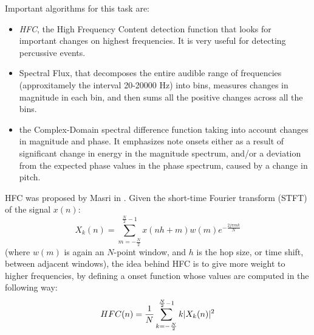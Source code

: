 Important algorithms for this task are:
\begin{itemize}
\item \textit{HFC}, the High Frequency Content detection function that looks for important changes on highest frequencies. It is very useful for detecting percussive events.
\item Spectral Flux, that decomposes the entire audible range of frequencies (approxitamely the interval 20-20000 Hz) into bins, measures changes in magnitude in each bin, and then sums all the positive changes across all the bins.
\item the Complex-Domain spectral difference function \cite{bello04} taking into account changes in magnitude and phase. It emphasizes note onsets either as a result of significant change in energy in the magnitude spectrum, and/or a deviation from the expected phase values in the phase spectrum, caused by a change in pitch.
\end{itemize}  
HFC was proposed by Masri in \cite{masri96}. Given the short-time Fourier transform (STFT) of the signal $x(n)$:\\
\begin{equation}
X_k(n) = \sum\limits_{m=-\frac{N}{2}}^{\frac{N}{2}-1} x(nh + m)w(m)e^{-\frac{2j\pi mk}{N}}
\end{equation}
(where $w(m)$ is again an $N$-point window, and $h$ is the hop size, or time shift, between adjacent windows), the idea behind HFC is to give more weight to higher frequencies, by defining a onset function whose values are computed in the following way:
\begin{equation}
HFC(n) = \frac{1}{N}\sum\limits_{k=-\frac{N}{2}}^{\frac{N}{2}-1} k\lvert X_k(n)\rvert^{2}
\end{equation}

